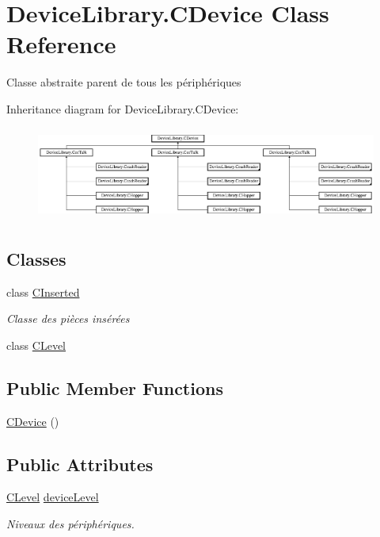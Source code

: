 \hypertarget{class_device_library_1_1_c_device}{}\section{Device\+Library.\+C\+Device Class Reference}
\label{class_device_library_1_1_c_device}


Classe abstraite parent de tous les périphériques  


Inheritance diagram for Device\+Library.\+C\+Device\+:\begin{figure}[H]
\begin{center}
\leavevmode
\includegraphics[height=3.076923cm]{class_device_library_1_1_c_device}
\end{center}
\end{figure}
\subsection*{Classes}
\begin{DoxyCompactItemize}
\item 
class \mbox{\hyperlink{class_device_library_1_1_c_device_1_1_c_inserted}{C\+Inserted}}
\begin{DoxyCompactList}\small\item\em Classe des pièces insérées \end{DoxyCompactList}\item 
class \mbox{\hyperlink{class_device_library_1_1_c_device_1_1_c_level}{C\+Level}}
\end{DoxyCompactItemize}
\subsection*{Public Member Functions}
\begin{DoxyCompactItemize}
\item 
\mbox{\hyperlink{class_device_library_1_1_c_device_a1ea11e47275e8d7baaa1f60a64c41d83}{C\+Device}} ()
\end{DoxyCompactItemize}
\subsection*{Public Attributes}
\begin{DoxyCompactItemize}
\item 
\mbox{\hyperlink{class_device_library_1_1_c_device_1_1_c_level}{C\+Level}} \mbox{\hyperlink{class_device_library_1_1_c_device_ae70218e48d761e45c66226ab7ea40e48}{device\+Level}}
\begin{DoxyCompactList}\small\item\em Niveaux des périphériques. \end{DoxyCompactList}\end{DoxyCompactItemize}

